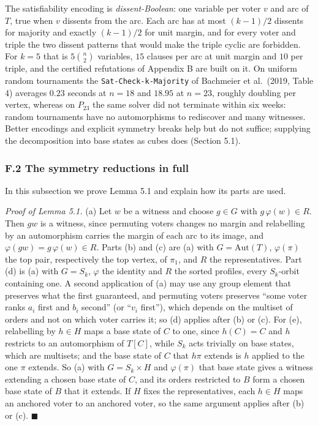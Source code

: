 \documentclass[
]{article}
\begin{document}
The satisfiability encoding is \emph{dissent-Boolean}: one variable per
voter \(v\) and arc of \(T\), true when \(v\) dissents from the arc.
Each arc has at most \((k-1)/2\) dissents for majority and exactly
\((k-1)/2\) for unit margin, and for every voter and triple the two
dissent patterns that would make the triple cyclic are forbidden. For
\(k = 5\) that is \(5\binom{n}{2}\) variables, \(15\) clauses per arc at
unit margin and \(10\) per triple, and the certified refutations of
Appendix B are built on it. On uniform random tournaments the
\texttt{Sat-Check-k-Majority} of Bachmeier et al.~(2019, Table 4)
averages \(0.23\) seconds at \(n = 18\) and \(18.95\) at \(n = 23\),
roughly doubling per vertex, whereas on \(P_{23}\) the same solver did
not terminate within six weeks: random tournaments have no automorphisms
to rediscover and many witnesses. Better encodings and explicit symmetry
breaks help but do not suffice; supplying the decomposition into base
states as cubes does (Section 5.1).

\subsubsection{F.2 The symmetry reductions in
full}\label{f.2-the-symmetry-reductions-in-full}

In this subsection we prove Lemma 5.1 and explain how its parts are
used.

\emph{Proof of Lemma 5.1.} (a) Let \(w\) be a witness and choose
\(g \in G\) with \(g\,\varphi(w) \in R\). Then \(gw\) is a witness,
since permuting voters changes no margin and relabelling by an
automorphism carries the margin of each arc to its image, and
\(\varphi(gw) = g\,\varphi(w) \in R\). Parts (b) and (c) are (a) with
\(G = \mathrm{Aut}(T)\), \(\varphi(\pi)\) the top pair, respectively the
top vertex, of \(\pi_1\), and \(R\) the representatives. Part (d) is (a)
with \(G = S_k\), \(\varphi\) the identity and \(R\) the sorted
profiles, every \(S_k\)-orbit containing one. A second application of
(a) may use any group element that preserves what the first guaranteed,
and permuting voters preserves ``some voter ranks \(a_i\) first and
\(b_i\) second'' (or ``\(v_i\) first''), which depends on the multiset
of orders and not on which voter carries it; so (d) applies after (b) or
(c). For (e), relabelling by \(h \in H\) maps a base state of \(C\) to
one, since \(h(C) = C\) and \(h\) restricts to an automorphism of
\(T[C]\), while \(S_k\) acts trivially on base states, which are
multisets; and the base state of \(C\) that \(h\pi\) extends is \(h\)
applied to the one \(\pi\) extends. So (a) with \(G = S_k \times H\) and
\(\varphi(\pi)\) that base state gives a witness extending a chosen base
state of \(C\), and its orders restricted to \(B\) form a chosen base
state of \(B\) that it extends. If \(H\) fixes the representatives, each
\(h \in H\) maps an anchored voter to an anchored voter, so the same
argument applies after (b) or (c). \(\blacksquare\)
\end{document}
